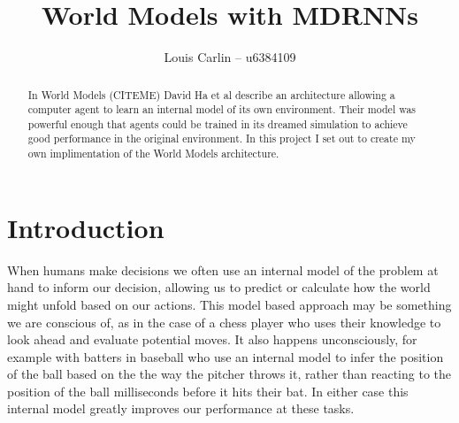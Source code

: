 \documentclass{article}
\author{Louis Carlin -- u6384109}
\title{World Models with MDRNNs}
\theoremstyle{definition}
\begin{document}
\maketitle
\begin{abstract}
In World Models (CITEME) David Ha et al describe an architecture allowing a computer agent to learn an internal model of its own environment.
Their model was powerful enough that agents could be trained in its dreamed simulation to achieve good performance in the original environment.
In this project I set out to create my own implimentation of the World Models architecture.

\end{abstract}

\section{Introduction}
When humans make decisions we often use an internal model of the problem at hand to inform our decision, allowing us to predict or calculate how the world might unfold based on our actions.
This model based approach may be something we are conscious of, as in the case of a chess player who uses their knowledge to look ahead and evaluate potential moves.
It also happens unconsciously, for example with batters in baseball who use an internal model to infer the position of the ball based on the the way the pitcher throws it, rather than reacting to the position of the ball milliseconds before it hits their bat.
In either case this internal model greatly improves our performance at these tasks.
\end{document}
